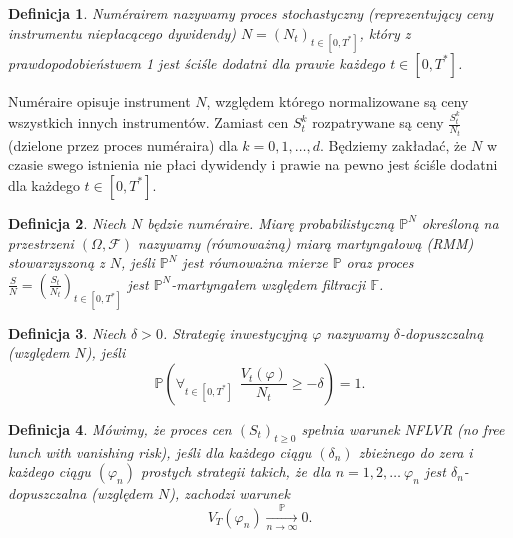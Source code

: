 \documentclass{mini}
\theoremstyle{mythstyle}
\newtheorem{Definicja}{Definicja}[chapter]
\begin{document}
\begin{Definicja}
	Num\'{e}rairem nazywamy proces stochastyczny (reprezentujący ceny instrumentu niepłacącego dywidendy) $N = (N_t)_{t\in [0,T^*]}$, który z prawdopodobieństwem 1 jest ściśle dodatni dla prawie każdego $t\in [0,T^*]$.
\end{Definicja}
	Num\'{e}raire opisuje instrument $N$, względem którego normalizowane są ceny wszystkich innych instrumentów. Zamiast cen $S_t^k$ rozpatrywane są ceny $\frac{S_t^k}{N_t}$ (dzielone przez proces num\'{e}raira) dla $k=0,1,\ldots,d$. Będziemy zakładać, że $N$ w czasie swego istnienia nie płaci dywidendy i prawie na pewno jest ściśle dodatni dla każdego $t\in [0,T^*]$.\\
\begin{Definicja}
	Niech $N$ będzie num\'{e}raire. Miarę probabilistyczną $\mathbb{P}^N$ określoną na przestrzeni $(\Omega,\mathcal{F})$ nazywamy (równoważną) miarą martyngałową (RMM) stowarzyszoną z $N$, jeśli $\mathbb{P}^N$ jest równoważna mierze $\mathbb{P}$ oraz proces $\frac{S}{N}=(\frac{S_t}{N_t})_{t\in [0,T^*]}$ jest $\mathbb{P}^N$-martyngałem względem filtracji $\mathbb{F}$.\\
\end{Definicja}
\begin{Definicja}
	Niech $\delta>0$. Strategię inwestycyjną $\varphi$ nazywamy $\delta$-dopuszczalną (względem $N$), jeśli \[ \mathbb{P}\left(\forall_{t\in [0,T^*]} \ \ \frac{V_t(\varphi)}{N_t}\geq -\delta \right) = 1. \]
\end{Definicja}

\begin{Definicja}
	Mówimy, że proces cen $(S_t)_{t\ge 0}$ spełnia warunek NFLVR (no free lunch with vanishing risk), jeśli dla każdego ciągu $(\delta_n)$ zbieżnego do zera i każdego ciągu $(\varphi_n)$ prostych strategii takich, że 	dla $n=1,2,\ldots \ \varphi_n$ jest $\delta_n$-dopuszczalna (względem $N$), zachodzi warunek \[ V_T(\varphi_n)\xrightarrow[n\rightarrow
	\infty]{\mathbb{P}}0. \]
\end{Definicja}
\end{document}
